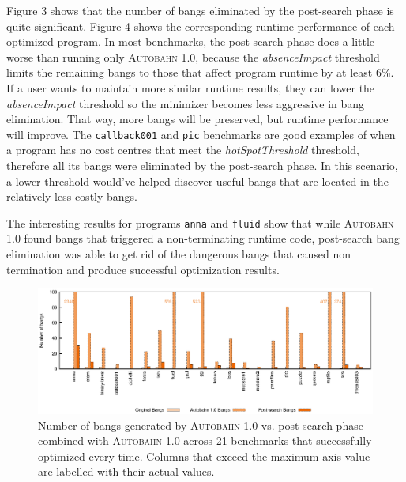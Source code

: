 \documentclass[format=sigplan, review=true]{acmart}
\newcommand{\hotspotcost}[0]{\textit{hotSpotThreshold}}
\newcommand{\dangerous}[0]{dangerous}
\newcommand{\Ao}[0]{\textsc{Autobahn 1.0}}
\newcommand{\postopt}[0]{post-search}
\newcommand{\absim}[0]{\textit{absenceImpact}}
\newcommand{\nonterm}[0]{non-terminating}
\begin{document}
Figure 3 shows that the number of bangs eliminated by the \postopt{} phase is quite significant. Figure 4 shows the corresponding runtime performance of each optimized program. In most benchmarks, the \postopt{} phase does a little worse than running only \Ao{}, because the \absim{} threshold limits the remaining bangs to those that affect program runtime by at least 6\%. If a user wants to maintain more similar runtime results, they can lower the \absim{} threshold so the minimizer becomes less aggressive in bang elimination. That way, more bangs will be preserved, but runtime performance will improve. The \texttt{callback001} and \texttt{pic} benchmarks are good examples of when a program has no cost centres that meet the \hotspotcost{} threshold, therefore all its bangs were eliminated by the \postopt{} phase. In this scenario, a lower threshold would've helped discover useful bangs that are located in the relatively less costly bangs. 

The interesting results for programs \texttt{anna} and \texttt{fluid} show that while \Ao{} found bangs that triggered a \nonterm{} runtime code, \postopt{} bang elimination was able to get rid of the \dangerous{} bangs that caused non termination and produce successful optimization results. 

\begin{figure}
\includegraphics[width=\textwidth]{aut-post-bangs}
\caption{Number of bangs generated by \Ao{} vs. \postopt{} phase combined with \Ao{} across 21 benchmarks that successfully optimized every time. Columns that exceed the maximum axis value are labelled with their actual values. }
\end{figure}
\end{document}

